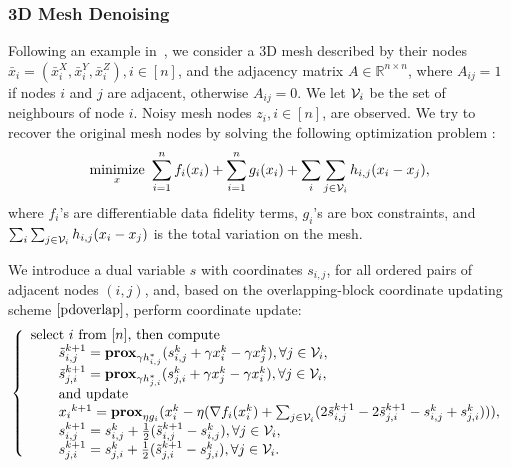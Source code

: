 \subsubsection{3D Mesh Denoising}
Following an example in~\cite{repetti2015random}, we consider a 3D mesh described by their nodes $\bar{x}_i=(\bar{x}_i^X,\bar{x}_i^Y,\bar{x}_i^Z), i\in[n]$, and the adjacency matrix $A\in\mathbb{R}^{n\times n}$, where $A_{ij} = 1$ if nodes $i$ and $j$ are adjacent, otherwise $A_{ij} = 0$. We let ${\mathcal{V}}_i$  be the set of neighbours of node $i$. Noisy mesh nodes $z_i, i \in [n]$, are observed. We try to recover the original mesh nodes by solving the following optimization problem \cite{repetti2015random}:
\begin{equation}
\Min_{x} ~\sum_{i=1}^n f_i(x_i)+\sum_{i=1}^n g_i(x_i)+\sum_{i} \sum_{j\in \cV_{i}} h_{i,j}(x_{i}-x_{j}),
\end{equation}
where $f_i$'s are differentiable data fidelity terms, $g_i$'s are box constraints, and $\sum_{i} \sum_{j\in {\mathcal{V}}_{i}}h_{i,j}(x_{i}-x_{j})$ is the total variation on the mesh.

We introduce a dual variable $s$ with coordinates $s_{i,j}$, for all ordered pairs of adjacent nodes $(i,j)$, and, based on the overlapping-block coordinate updating scheme $\eqref{pdoverlap}$, perform coordinate update:
\begin{equation}
\left\{
\begin{array}{l}
\text{select $i$ from $[n]$, then compute }\\
\qquad \tilde{s}_{i,j}^{k+1}=\prox_{\gamma h_{i,j}^*} (s_{i,j}^k+\gamma x_i^k-\gamma x_j^k),\forall j\in\cV_i,\\
\qquad \tilde{s}_{j,i}^{k+1}=\prox_{\gamma h_{j,i}^*} (s_{j,i}^k+\gamma x_j^k-\gamma x_i^k),\forall j\in\cV_i,\\
\qquad \textnormal{and update}\\
\qquad {x_i}^{k+1}=\prox_{\eta g_i}(x_i^k-\eta(\nabla f_i(x_i^k)+\sum_{j\in\cV_i}(2\tilde{s}_{i,j}^{k+1}-2\tilde{s}_{j,i}^{k+1}-s_{i,j}^k+{s}_{j,i}^{k}))),\\
\qquad s_{i,j}^{k+1}=s_{i,j}^k+\frac{1}{2}(\tilde{s}_{i,j}^{k+1}-s_{i,j}^k),\forall j\in\cV_i,\\
\qquad s_{j,i}^{k+1}=s_{j,i}^k+\frac{1}{2}(\tilde{s}_{j,i}^{k+1}-s_{j,i}^k),\forall j\in\cV_i.
\end{array}
\right.\nonumber
\end{equation}
